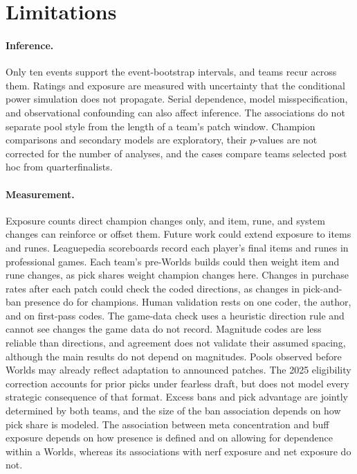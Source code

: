 \documentclass[11pt]{article}
\begin{document}
\section{Limitations}
\paragraph{Inference.} Only ten events support the event-bootstrap intervals, and teams recur across them. Ratings and exposure are measured with uncertainty that the conditional power simulation does not propagate. Serial dependence, model misspecification, and observational confounding can also affect inference. The associations do not separate pool style from the length of a team's patch window. Champion comparisons and secondary models are exploratory, their $p$-values are not corrected for the number of analyses, and the cases compare teams selected post hoc from quarterfinalists.

\paragraph{Measurement.} Exposure counts direct champion changes only, and item, rune, and system changes can reinforce or offset them. Future work could extend exposure to items and runes. Leaguepedia scoreboards record each player's final items and runes in professional games. Each team's pre-Worlds builds could then weight item and rune changes, as pick shares weight champion changes here. Changes in purchase rates after each patch could check the coded directions, as changes in pick-and-ban presence do for champions. Human validation rests on one coder, the author, and on first-pass codes. The game-data check uses a heuristic direction rule and cannot see changes the game data do not record. Magnitude codes are less reliable than directions, and agreement does not validate their assumed spacing, although the main results do not depend on magnitudes. Pools observed before Worlds may already reflect adaptation to announced patches. The 2025 eligibility correction accounts for prior picks under fearless draft, but does not model every strategic consequence of that format. Excess bans and pick advantage are jointly determined by both teams, and the size of the ban association depends on how pick share is modeled. The association between meta concentration and buff exposure depends on how presence is defined and on allowing for dependence within a Worlds, whereas its associations with nerf exposure and net exposure do not.
\end{document}
